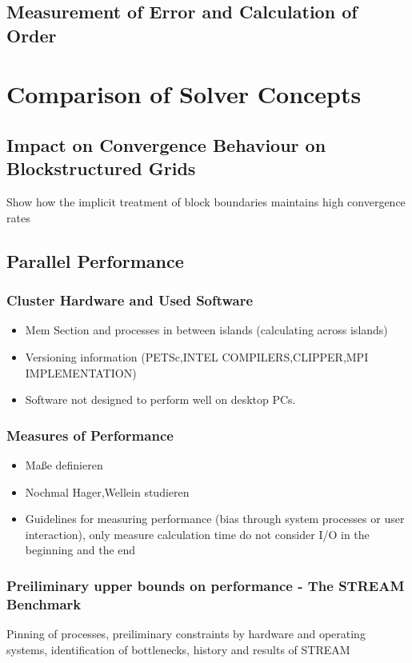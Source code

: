 \documentclass[article,type=msc,colorback,accentcolor=tud2a]{tudthesis}
\begin{document}
    \subsection{Measurement of Error and Calculation of Order}

  \section{Comparison of Solver Concepts}
  
    \subsection{Impact on Convergence Behaviour on Blockstructured Grids}

      Show how the implicit treatment of block boundaries maintains high convergence rates

    \subsection{Parallel Performance}
      \subsubsection{Cluster Hardware and Used Software}
        \begin{itemize}
          \item Mem Section and processes in between islands (calculating across islands)
          \item Versioning information (PETSc,INTEL COMPILERS,CLIPPER,MPI IMPLEMENTATION)
          \item Software not designed to perform well on desktop PCs.
        \end{itemize}

      \subsubsection{Measures of Performance}
        \begin{itemize}
          \item Maße definieren
          \item Nochmal Hager,Wellein studieren
          \item Guidelines for measuring performance (bias through system processes or user interaction), only measure calculation time do not consider I/O in the beginning and the end
        \end{itemize}
      \subsubsection{Preiliminary upper bounds on performance - The STREAM Benchmark}
        Pinning of processes, preiliminary constraints by hardware and operating systems, identification of bottlenecks, history and results of STREAM
\end{document}
